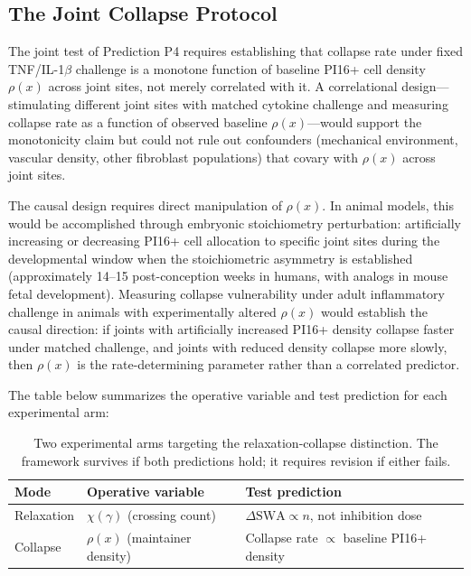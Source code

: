 \documentclass[12pt, a4paper]{article}
\theoremstyle{definition}
\begin{document}
\subsection{The Joint Collapse Protocol}

The joint test of Prediction P4 requires establishing that collapse rate under fixed TNF/IL-1$\beta$ challenge is a monotone function of baseline PI16+ cell density $\rho(x)$ across joint sites, not merely correlated with it. A correlational design---stimulating different joint sites with matched cytokine challenge and measuring collapse rate as a function of observed baseline $\rho(x)$---would support the monotonicity claim but could not rule out confounders (mechanical environment, vascular density, other fibroblast populations) that covary with $\rho(x)$ across joint sites.

The causal design requires direct manipulation of $\rho(x)$. In animal models, this would be accomplished through embryonic stoichiometry perturbation: artificially increasing or decreasing PI16+ cell allocation to specific joint sites during the developmental window when the stoichiometric asymmetry is established (approximately 14--15 post-conception weeks in humans, with analogs in mouse fetal development). Measuring collapse vulnerability under adult inflammatory challenge in animals with experimentally altered $\rho(x)$ would establish the causal direction: if joints with artificially increased PI16+ density collapse faster under matched challenge, and joints with reduced density collapse more slowly, then $\rho(x)$ is the rate-determining parameter rather than a correlated predictor.

The table below summarizes the operative variable and test prediction for each experimental arm:

\begin{table}[H]
\centering
\begin{tabular}{llp{5.8cm}}
\toprule
\textbf{Mode} & \textbf{Operative variable} & \textbf{Test prediction} \\
\midrule
Relaxation & $\chi(\gamma)$ (crossing count) & $\Delta\text{SWA} \propto n$, not inhibition dose \\
Collapse   & $\rho(x)$ (maintainer density) & Collapse rate $\propto$ baseline PI16+ density \\
\bottomrule
\end{tabular}
\caption{Two experimental arms targeting the relaxation-collapse distinction. The framework survives if both predictions hold; it requires revision if either fails.}
\end{table}
\end{document}
